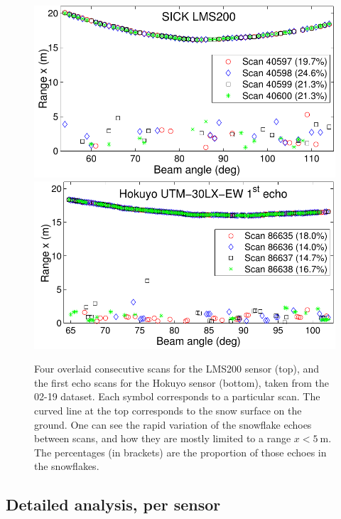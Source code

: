  \begin{figure}[th]
    \centering
    \includegraphics[trim={0.2cm 0 0 0},clip,width=0.9\linewidth]{./img/LMS200_4Scans_Feb19.pdf}
    \includegraphics[trim={0.2cm 0 0 0},clip,width=0.9\linewidth]{./img/Hokuyo_4Scans_Feb19.pdf}
    \caption{Four overlaid consecutive scans for the LMS200 sensor (top), and the first echo scans for the Hokuyo sensor (bottom), taken from the 02-19 dataset. Each symbol corresponds to a particular scan. The curved line at the top corresponds to the snow surface on the ground. One can see the rapid variation of the snowflake echoes between scans, and how they are mostly limited to a range $x<\SI{5}{\meter}$. The percentages (in brackets) are the proportion of those echoes in the snowflakes.}
    \label{fig:LMS200_4Scans_Feb19}
\end{figure}

\subsection{Detailed analysis, per sensor}

